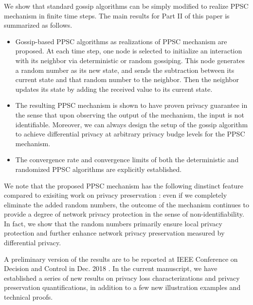 \documentclass[a4paper, 11pt]{article}
\newcommand{\1}{\mathbf{1}}
\begin{document}
We show that standard gossip algorithms can be simply modified to realize PPSC mechanism in finite time steps. The main results for Part II of this paper is summarized as follows. 
\begin{itemize}
	\item Gossip-based PPSC algorithms as realizations of PPSC mechanism are proposed. At each time step,  one node is selected to  initialize an interaction with its neighbor via deterministic or random gossiping. This node generates a random number as its new state,  and  sends the subtraction between its current state and that random number to the neighbor. Then the neighbor updates its state by adding the received value to its current state. 
	
	\item The resulting PPSC mechanism is shown to have proven privacy guarantee in the sense that upon observing the output of the mechanism, the input is not identifiable. Moreover, we can always design the setup of the gossip algorithm to achieve differential privacy at arbitrary privacy budge levels for the PPSC mechanism. 
	
	\item The convergence rate and convergence limits of both the deterministic and randomized PPSC algorithms are explicitly established. 
\end{itemize}
We note that the proposed  PPSC mechanism has the following dinstinct feature compared to exisiting work on privacy preservation \cite{huang2012differentially,manitara2013privacy,mo2017privacy,nicolas2017,claudio2018}: even if we completely eliminate the added random numbers, the outcome of the mechanism continues to provide a degree of network privacy protection in the sense of  non-identifiability. In fact, we show that the random numbers primarily ensure local privacy protection and further enhance network privacy preservation measured by differential privacy.  






A preliminary version of the results are to be reported at IEEE Conference on Decision and Control in Dec. 2018 \cite{cdc1,cdc2}. In the current manuscript, we have established a series of   new results on privacy loss characterizations and privacy preservation quantifications, in addition to a few new illustration  examples and technical proofs. 
\end{document}
